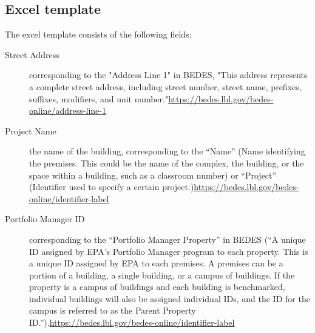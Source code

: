 \documentclass[12pt]{article}
\begin{document}
\subsection{Excel template}
The excel template consists of the following fields:
\begin{description}
\item[Street Address] corresponding to the "Address Line 1" in BEDES,
  "This address represents a complete street address, including street
  number, street name, prefixes, suffixes, modifiers, and unit
  number."\url{https://bedes.lbl.gov/bedes-online/address-line-1}
\item[Project Name] the name of the building, corresponding to the
  ``Name'' (Name identifying the premises. This could be the name of
  the complex, the building, or the space within a building, such as a
  classroom number) or ``Project'' (Identifier used to specify a
  certain
  project.)\url{https://bedes.lbl.gov/bedes-online/identifier-label}
\item[Portfolio Manager ID] corresponding to the ``Portfolio Manager
  Property'' in BEDES (``A unique ID assigned by EPA's Portfolio
  Manager program to each property. This is a unique ID assigned by
  EPA to each premises. A premises can be a portion of a building, a
  single building, or a campus of buildings. If the property is a
  campus of buildings and each building is benchmarked, individual
  buildings will also be assigned individual IDs, and the ID for the
  campus is referred to as the Parent Property
  ID.'').\url{https://bedes.lbl.gov/bedes-online/identifier-label}
  

\end{description}
\end{document}
